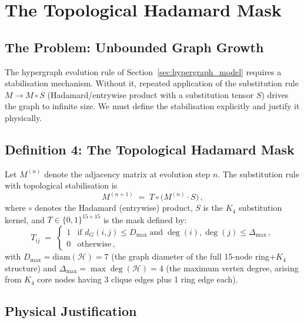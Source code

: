 \section{The Topological Hadamard Mask}
\label{sec:hadamard_mask}

\subsection{The Problem: Unbounded Graph Growth}

The hypergraph evolution rule of Section~\ref{sec:hypergraph_model} requires a stabilisation mechanism.  Without it, repeated application of the substitution rule $M \to M \circ S$ (Hadamard/entrywise product with a substitution tensor $S$) drives the graph to infinite size.  We must define the stabilisation explicitly and justify it physically.

\subsection{Definition 4: The Topological Hadamard Mask}

Let $M^{(n)}$ denote the adjacency matrix at evolution step $n$.  The substitution rule with topological stabilisation is
\begin{equation}
    M^{(n+1)} \;=\; T \circ \bigl(M^{(n)} \cdot S\bigr)\,,
    \label{eq:evolution_rule}
\end{equation}
where $\circ$ denotes the Hadamard (entrywise) product, $S$ is the $K_4$ substitution kernel, and $T \in \{0,1\}^{15 \times 15}$ is the mask defined by:
\begin{equation}
    T_{ij} \;=\; \begin{cases}
        1 & \text{if } d_G(i,j) \leq D_{\max} \;\text{and}\; \deg(i), \deg(j) \leq \Delta_{\max}\,, \\
        0 & \text{otherwise}\,,
    \end{cases}
    \label{eq:mask_definition}
\end{equation}
with $D_{\max} = \mathrm{diam}(\mathcal{H}) = 7$ (the graph diameter of the full 15-node ring+$K_4$ structure) and $\Delta_{\max} = \max\deg(\mathcal{H}) = 4$ (the maximum vertex degree, arising from $K_4$ core nodes having 3 clique edges plus 1 ring edge each).

\subsection{Physical Justification}


